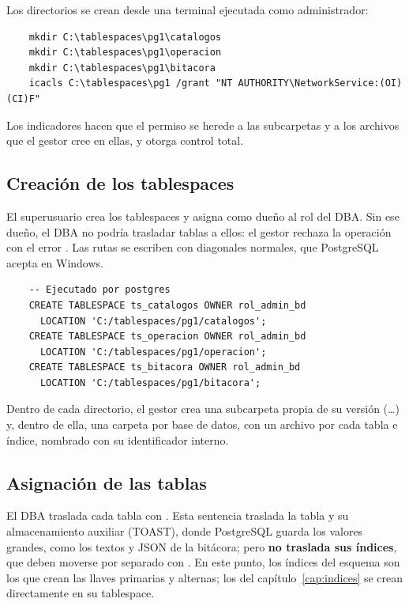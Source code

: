 Los directorios se crean desde una terminal ejecutada como administrador:

\begin{verbatim}
	mkdir C:\tablespaces\pg1\catalogos
	mkdir C:\tablespaces\pg1\operacion
	mkdir C:\tablespaces\pg1\bitacora
	icacls C:\tablespaces\pg1 /grant "NT AUTHORITY\NetworkService:(OI)(CI)F"
\end{verbatim}

Los indicadores  hacen que el permiso se herede a las subcarpetas y a los archivos que el gestor cree en ellas, y  otorga control total.

\subsection{Creaci\'on de los tablespaces}

El superusuario crea los tablespaces y asigna como dueño al rol del DBA. Sin ese dueño, el DBA no podría trasladar tablas a ellos: el gestor rechaza la operación con el error . Las rutas se escriben con diagonales normales, que PostgreSQL acepta en Windows.

\begin{verbatim}
	-- Ejecutado por postgres
	CREATE TABLESPACE ts_catalogos OWNER rol_admin_bd
	  LOCATION 'C:/tablespaces/pg1/catalogos';
	CREATE TABLESPACE ts_operacion OWNER rol_admin_bd
	  LOCATION 'C:/tablespaces/pg1/operacion';
	CREATE TABLESPACE ts_bitacora OWNER rol_admin_bd
	  LOCATION 'C:/tablespaces/pg1/bitacora';
\end{verbatim}

Dentro de cada directorio, el gestor crea una subcarpeta propia de su versión (\ldots) y, dentro de ella, una carpeta por base de datos, con un archivo por cada tabla e índice, nombrado con su identificador interno.

\subsection{Asignaci\'on de las tablas}

El DBA traslada cada tabla con . Esta sentencia traslada la tabla y su almacenamiento auxiliar (TOAST), donde PostgreSQL guarda los valores grandes, como los textos y JSON de la bitácora; pero \textbf{no traslada sus índices}, que deben moverse por separado con . En este punto, los índices del esquema son los que crean las llaves primarias y alternas; los del capítulo~\ref{cap:indices} se crean directamente en su tablespace.

